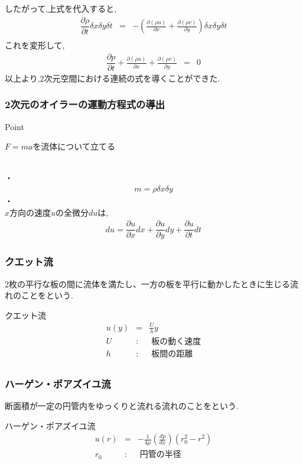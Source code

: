 \documentclass[a4paper]{jsarticle}
\begin{document}
したがって,上式を代入すると,
\begin{eqnarray*}
    \dfrac{\partial \rho}{\partial t}\delta x \delta y \delta t&=&-\left(\frac{\partial\left(\rho u\right)}{\partial x}+\frac{\partial\left(\rho v\right)}{\partial y}\right)\delta x \delta y \delta t\\
\end{eqnarray*}
これを変形して,
\begin{eqnarray*}
    \dfrac{\partial p}{\partial t}+\frac{\partial\left(\rho u\right)}{\partial x}+\frac{\partial\left(\rho v\right)}{\partial y}&=&0
\end{eqnarray*}
以上より,2次元空間における連続の式を導くことができた.
\subsubsection{2次元のオイラーの運動方程式の導出}
\begin{itembox}[l]{Point}
    \begin{center}
        \quad$F=ma$を流体について立てる
    \end{center}
\end{itembox}
\\
・\\
\begin{eqnarray*}
    m=\rho \delta x \delta y
\end{eqnarray*}
・\\
$x$方向の速度$u$の全微分$du$は,
\begin{eqnarray*}
    du=\dfrac{\partial u}{\partial x}dx+\dfrac{\partial u}{\partial y}dy+\dfrac{\partial u}{\partial t}dt
\end{eqnarray*}
\subsubsection{クエット流}
2枚の平行な板の間に流体を満たし、一方の板を平行に動かしたときに生じる流れのことをという.
\begin{itembox}[l]{クエット流}
    \begin{eqnarray*}
        u\left(y\right)&=&\frac{U}{h}y\\
        U \;&:&\; 板の動く速度\\
        h \;&:&\; 板間の距離\\
    \end{eqnarray*}
\end{itembox}
\subsubsection{ハーゲン・ポアズイユ流}
断面積が一定の円管内をゆっくりと流れる流れのことをという.
\begin{itembox}[l]{ハーゲン・ポアズイユ流}
    \begin{eqnarray*}
        u\left(r\right)&=&-\frac{1}{4\mu}\left(\frac{dp}{dx}\right)\left(r_0^2-r^2\right)\\
        r_0\; &:&\; 円管の半径\\
    \end{eqnarray*}
\end{itembox}
\end{document}
